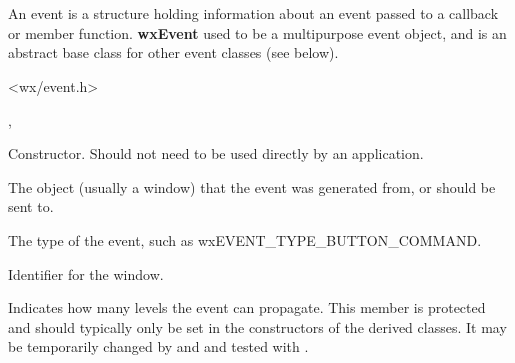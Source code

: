 \section{}\label{wxevent}

An event is a structure holding information about an event passed to a
callback or member function. {\bf wxEvent} used to be a multipurpose
event object, and is an abstract base class for other event classes (see below).




<wx/event.h>


,\rtfsp
{}




Constructor. Should not need to be used directly by an application.



The object (usually a window) that the event was generated from,
or should be sent to.



The type of the event, such as wxEVENT\_TYPE\_BUTTON\_COMMAND.



Identifier for the window.



Indicates how many levels the event can propagate. This member is protected and
should typically only be set in the constructors of the derived classes. It
may be temporarily changed by  
and  and tested with 
.

